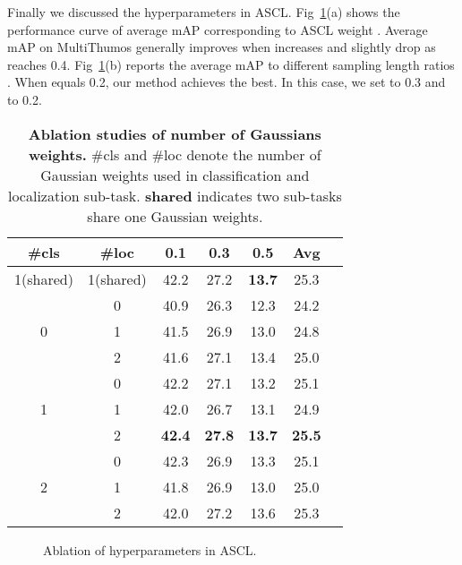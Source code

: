 \documentclass[10pt,twocolumn,letterpaper]{article}
\begin{document}
\par Finally we discussed the hyperparameters in ASCL. Fig~\ref{fig:abl_lambda}(a) shows the performance curve of average mAP corresponding to ASCL weight . Average mAP on MultiThumos generally improves when  increases and slightly drop as  reaches 0.4. Fig~\ref{fig:abl_lambda}(b) reports the average mAP to different sampling length ratios . When  equals 0.2, our method achieves the best. In this case, we set  to 0.3 and  to 0.2. 

\begin{table}[t]
\centering
\small
\caption{\label{tab:abl_numgaussian}\textbf{Ablation studies of number of Gaussians weights.} \#cls and \#loc denote the number of Gaussian weights used in classification and localization sub-task. \textbf{shared} indicates two sub-tasks share one Gaussian weights.}
\vspace{0.5em}
\small
\begin{tabular}{c|c|ccccc}
        \toprule
	{\#cls} & {\#loc} & 0.1 &0.3 &  0.5 & Avg\\
		\hline
        1(shared) & 1(shared)     & 42.2 & 27.2 & \textbf{13.7} &25.3 \\ 
        \hline
	\multirow{3}{*}{0} & 0     & 40.9 & 26.3 & 12.3  &  24.2      \\
	& 1                        & 41.5 &  26.9 & 13.0 & 24.8\\
	& 2                        & 41.6 &  27.1  & 13.4 & 25.0 \\
	\hline
	\multirow{3}{*}{1} & 0     & 42.2 & 27.1 & 13.2 & 25.1 \\
	& 1                        & 42.0 & 26.7 & 13.1 & 24.9 \\
	& 2                        & \textbf{42.4} & \textbf{27.8} & \textbf{13.7} &\textbf{25.5} \\
        \hline
        \multirow{3}{*}{2} & 0     & 42.3 & 26.9 & 13.3 &    25.1 \\
	& 1                        & 41.8 & 26.9 & 13.0 &    25.0 \\
	& 2                        & 42.0 & 27.2 & 13.6 &   25.3 \\
        \bottomrule
\end{tabular}
\vspace{-0.5em}
\end{table}







\begin{figure}[t]
\centering
{}
\caption{Ablation of hyperparameters in ASCL.}
\label{fig:abl_lambda}
\end{figure}
\end{document}
